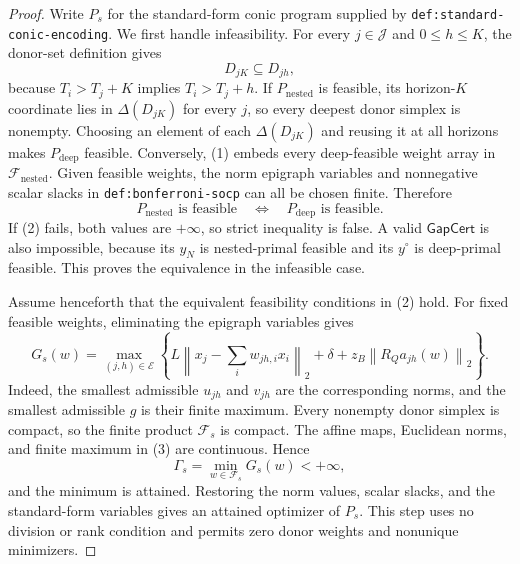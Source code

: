 \documentclass{article}
\begin{document}
\begin{proof}
Write \(P_s\) for the standard-form conic program supplied by \texttt{def:standard-conic-encoding}.  We first handle infeasibility.  For every \(j\in\mathcal J\) and \(0\leq h\leq K\), the donor-set definition gives
\[
 D_{jK}\subseteq D_{jh},                                                \tag{1}
\]
because \(T_i>T_j+K\) implies \(T_i>T_j+h\).  If \(P_{\mathrm{nested}}\) is feasible, its horizon-\(K\) coordinate lies in \(\Delta(D_{jK})\) for every \(j\), so every deepest donor simplex is nonempty.  Choosing an element of each \(\Delta(D_{jK})\) and reusing it at all horizons makes \(P_{\mathrm{deep}}\) feasible.  Conversely, (1) embeds every deep-feasible weight array in \(\mathcal F_{\mathrm{nested}}\).  Given feasible weights, the norm epigraph variables and nonnegative scalar slacks in \texttt{def:bonferroni-socp} can all be chosen finite.  Therefore
\[
 P_{\mathrm{nested}}\text{ is feasible}
 \quad\Longleftrightarrow\quad
 P_{\mathrm{deep}}\text{ is feasible}.                                \tag{2}
\]
If (2) fails, both values are \(+\infty\), so strict inequality is false.  A valid \(\mathsf{GapCert}\) is also impossible, because its \(y_N\) is nested-primal feasible and its \(y^\circ\) is deep-primal feasible.  This proves the equivalence in the infeasible case.

Assume henceforth that the equivalent feasibility conditions in (2) hold.  For fixed feasible weights, eliminating the epigraph variables gives
\[
 G_s(w)=\max_{(j,h)\in\mathcal E}
 \left\{
 L\left\|x_j-\sum_iw_{jh,i}x_i\right\|_2+
 \delta+z_B\left\|R_Qa_{jh}(w)\right\|_2
 \right\}.                                                             \tag{3}
\]
Indeed, the smallest admissible \(u_{jh}\) and \(v_{jh}\) are the corresponding norms, and the smallest admissible \(g\) is their finite maximum.  Every nonempty donor simplex is compact, so the finite product \(\mathcal F_s\) is compact.  The affine maps, Euclidean norms, and finite maximum in (3) are continuous.  Hence
\[
 \Gamma_s=\min_{w\in\mathcal F_s}G_s(w)<+\infty,                       \tag{4}
\]
and the minimum is attained.  Restoring the norm values, scalar slacks, and the standard-form variables gives an attained optimizer of \(P_s\).  This step uses no division or rank condition and permits zero donor weights and nonunique minimizers.


\end{proof}
\end{document}
